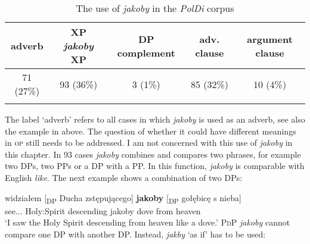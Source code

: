 \documentclass[output=paper
,modfonts
,nonflat]{langsci/langscibook}
\begin{document}
\begin{table}[h]  \begin{tabular}{ccccc}
 \lsptoprule
adverb & XP \emph{jakoby} XP & DP complement & \newline adv. clause & argument clause \\
\midrule
 71 (27\%) & 93 (36\%) & 3 (1\%) & 85 (32\%) & 10 (4\%)  \\
 \lspbottomrule
\end{tabular}
\caption{The use of \emph{jakoby} in the \emph{PolDi} corpus} \label{staropolski_statystka}
\end{table}

\noindent The label `adverb' refers to all cases in which \emph{jakoby} is used as an adverb, see also the example in  above. The question of whether it could have different meanings in \textsc{op} still needs to be addressed. I am not concerned with this use of \emph{jakoby} in this chapter. In 93 cases \emph{jakoby} combines and compares two phrases, for example two DPs, two PPs or a DP with a PP. In this function, \emph{jakoby} is comparable with English \emph{like}. The next example shows a combination of two DPs:

\ea \gll widziałem [\textsubscript{DP} Ducha zstępującego] \textbf{jakoby} [\textsubscript{DP} gołębicę s nieba] \label{pingwin} \\
		see.{\lptcp}.{\masc}.{\firstperson}{\sg} {} {Holy:Spirit} descending jakoby {} dove from heaven \\
\glt	`I saw the Holy Spirit descending from heaven like a dove.' 
\z
\textsc{PdP} \emph{jakoby} cannot compare one DP with another DP. Instead, \emph{jakby} `as if' has to be used:
\end{document}
